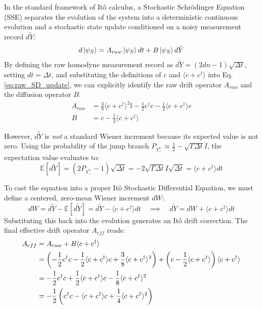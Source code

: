 \documentclass[a4paper,12pt]{article}
\begin{document}
In the standard framework of Itô calculus, a Stochastic Schrödinger Equation (SSE) separates the evolution of the system into a deterministic continuous evolution and a stochastic state update conditioned on a noisy measurement record $ d\tilde{Y} $:
\begin{equation}
	d\ket{\psi_{S}} = A_{raw} \ket{\psi_{S}} dt + B \ket{\psi_{S}} d\tilde{Y}
	\label{eq:general_SDE_structure}
\end{equation}
By defining the raw homodyne measurement record as $ d\tilde{Y} = (2dn - 1)\sqrt{\Delta t} $, setting $ dt = \Delta t $, and substituting the definitions of $ c $ and $ \langle c + c^\dagger \rangle $ into Eq.\ref{eq:raw_SD_update}, we can explicitly identify the raw drift operator $ A_{raw} $ and the diffusion operator $ B $:
\begin{align}
	A_{raw} &= \frac{3}{8}\langle c + c^\dagger \rangle^2 \mathbb{I} - \frac{1}{2}c^\dagger c - \frac{1}{2}\langle c + c^\dagger \rangle c \\
	B &= c - \frac{1}{2}\langle c + c^\dagger \rangle
\end{align}

However, $ d\tilde{Y} $ is \emph{not} a standard Wiener increment because its expected value is not zero. Using the probability of the jump branch $ P_{\chi_{-}^{a}} \approx \frac{1}{2} - \sqrt{\Gamma \Delta t}I $, the expectation value evaluates to:
\begin{equation}
	\mathbb{E}[d\tilde{Y}] = \left(2 P_{\chi_{-}^{a}} - 1\right)\sqrt{\Delta t} = -2\sqrt{\Gamma \Delta t}I \sqrt{\Delta t} = \langle c + c^\dagger \rangle dt
\end{equation}

To cast the equation into a proper Itô Stochastic Differential Equation, we must define a centered, zero-mean Wiener increment $ dW $:
\begin{equation}
	dW = d\tilde{Y} - \mathbb{E}[d\tilde{Y}] = d\tilde{Y} - \langle c + c^\dagger \rangle dt \quad \implies \quad d\tilde{Y} = dW + \langle c + c^\dagger \rangle dt
\end{equation}
Substituting this back into the evolution generates an Itô drift correction. The final effective drift operator $ A_{eff} $ reads:
\begin{align}
	A_{eff} &= A_{raw} + B \langle c + c^\dagger \rangle \notag \\
	&= \left( -\frac{1}{2}c^\dagger c - \frac{1}{2}\langle c + c^\dagger \rangle c + \frac{3}{8}\langle c + c^\dagger \rangle^2 \right) + \left( c - \frac{1}{2}\langle c + c^\dagger \rangle \right) \langle c + c^\dagger \rangle \notag \\
	&= -\frac{1}{2}c^\dagger c + \frac{1}{2}\langle c + c^\dagger \rangle c - \frac{1}{8}\langle c + c^\dagger \rangle^2 \notag \\
	&= -\frac{1}{2}\left( c^\dagger c - \langle c + c^\dagger \rangle c + \frac{1}{4}\langle c + c^\dagger \rangle^2 \right)
\end{align}
\end{document}
